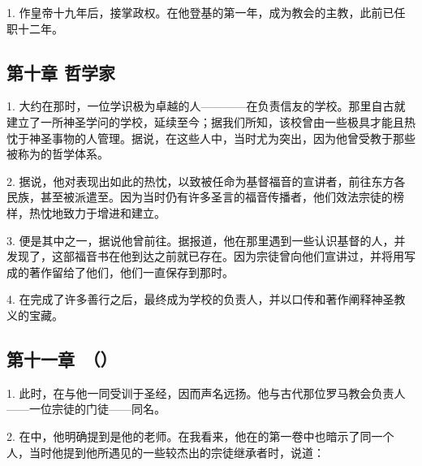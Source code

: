 1. 作皇帝十九年后，接掌政权。在他登基的第一年，成为教会的主教，此前已任职十二年。\par


\subsection{第十章 哲学家}

1. 大约在那时，一位学识极为卓越的人————在负责信友的学校。那里自古就建立了一所神圣学问的学校，延续至今；据我们所知，该校曾由一些极具才能且热忱于神圣事物的人管理。据说，在这些人中，当时尤为突出，因为他曾受教于那些被称为的哲学体系。\par

2. 据说，他对表现出如此的热忱，以致被任命为基督福音的宣讲者，前往东方各民族，甚至被派遣至。因为当时仍有许多圣言的福音传播者，他们效法宗徒的榜样，热忱地致力于增进和建立。\par

3. 便是其中之一，据说他曾前往。据报道，他在那里遇到一些认识基督的人，并发现了，这部福音书在他到达之前就已存在。因为宗徒曾向他们宣讲过，并将用写成的著作留给了他们，他们一直保存到那时。\par

4. 在完成了许多善行之后，最终成为学校的负责人，并以口传和著作阐释神圣教义的宝藏。\par


\subsection{第十一章　（）}

1. 此时，在与他一同受训于圣经，因而声名远扬。他与古代那位罗马教会负责人——一位宗徒的门徒——同名。\par

2. 在中，他明确提到是他的老师。在我看来，他在的第一卷中也暗示了同一个人，当时他提到他所遇见的一些较杰出的宗徒继承者时，说道：\par


